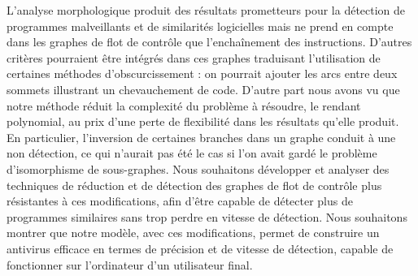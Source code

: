 L'analyse morphologique produit des résultats prometteurs pour la détection de programmes malveillants et de similarités logicielles mais ne prend en compte dans les graphes de flot de contrôle que l'enchaînement des instructions. D'autres critères pourraient être intégrés dans ces graphes traduisant l'utilisation de certaines méthodes d'obscurcissement : on pourrait ajouter les arcs entre deux sommets illustrant un chevauchement de code.
D'autre part nous avons vu que notre méthode réduit la complexité du problème à résoudre, le rendant polynomial, au prix d'une perte de flexibilité dans les résultats qu'elle produit.
En particulier, l'inversion de certaines branches  dans un graphe conduit à une non détection, ce qui n'aurait pas été le cas si l'on avait gardé le problème d'isomorphisme de sous-graphes.
Nous souhaitons développer et analyser des techniques de réduction et de détection des graphes de flot de contrôle plus résistantes à ces modifications, afin d'être capable de détecter plus de programmes similaires sans trop perdre en vitesse de détection.
Nous souhaitons montrer que notre modèle, avec ces modifications, permet de construire un antivirus efficace en termes de précision et de vitesse de détection, capable de fonctionner sur l'ordinateur d'un utilisateur final.


